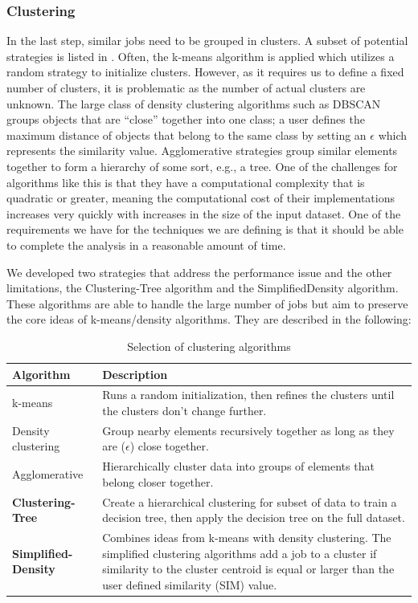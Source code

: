 \documentclass{jhps}
\begin{document}
\subsubsection{Clustering}
In the last step, similar jobs need to be grouped in clusters.
A subset of potential strategies is listed in .
Often, the k-means algorithm is applied which utilizes a random strategy to initialize clusters.
However, as it requires us to define a fixed number of clusters, it is problematic as the number of actual clusters are unknown.
The large class of density clustering algorithms such as DBSCAN groups objects that are “close” together into one class; a user defines the maximum distance of objects that belong to the same class by setting an $\epsilon$ which represents the similarity value.
Agglomerative strategies group similar elements together to form a hierarchy of some sort, e.g., a tree.
One of the challenges for algorithms like this is that they have a computational complexity that is quadratic or greater, meaning the computational cost of their implementations increases very quickly with increases in the size of the input dataset.
One of the requirements we have for the techniques we are defining is that it should be able to complete the analysis in a reasonable amount of time.


We developed two strategies that address the performance issue and the other limitations, the Clustering-Tree algorithm and the SimplifiedDensity algorithm.
These algorithms are able to handle the large number of jobs but aim to preserve the core ideas of k-means/density algorithms.
They are described in the following:

\begin{table}
  \centering
  \begin{tabularx}{\textwidth}{lX}
    Algorithm & Description \\
    \midrule
    k-means & Runs a random initialization, then refines the clusters until the clusters don't change further.\\
    Density clustering &  Group nearby elements recursively together as long as they are ($\epsilon$) close together.\\
    Agglomerative &  Hierarchically cluster data into groups of elements that belong closer together.\\
    \textbf{Clustering-Tree} &  Create a hierarchical clustering for subset of data to train a decision tree, then apply the decision tree on the full dataset.\\
    \textbf{Simplified-Density} &  Combines ideas from k-means with density clustering.
The simplified clustering algorithms add a job to a cluster if similarity to the cluster centroid is equal or larger than the user defined similarity (SIM) value.\\
  \end{tabularx}
  \caption{Selection of clustering algorithms}
  \label{tab:clustering_algorithms}
\end{table}
\end{document}
